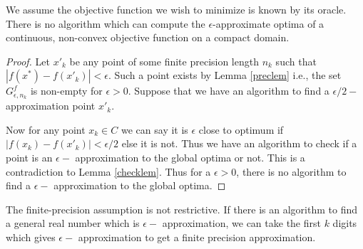 		\begin{theorem}\label{mainthm}
			We assume the objective function we wish to minimize is known by its oracle. There is no algorithm which can compute the $\epsilon$-approximate optima of a continuous, non-convex objective function on a compact domain.
		\end{theorem}
		
		\begin{proof}
		Let $x'_k$ be any point of some finite precision length $n_k$ such that $|f(x^*)-f(x'_k)| < \epsilon$. Such a point exists by Lemma \ref{preclem} i.e., the set $G^f_{\epsilon,n_k}$ is non-empty for $\epsilon > 0$. Suppose that we have an algorithm to find a $\epsilon/2-$ approximation point $x'_k$.%

		Now for any point $x_k \in C$ we can say it is $\epsilon$ close to optimum if $|f(x_k)-f(x'_k)| < \epsilon/2$ else it is not. Thus we have an algorithm to check if a point is an $\epsilon-$ approximation to the global optima or not. This is a contradiction to Lemma \ref{checklem}. Thus for a $\epsilon > 0$, there is no algorithm to find a $\epsilon-$ approximation to the global optima. 
		
	\end{proof}
	
	\begin{corollary}
		The finite-precision assumption is not restrictive. If there is an algorithm to find a general real number which is $\epsilon-$ approximation, we can take the first $k$ digits which gives $\epsilon-$ approximation to get a finite precision approximation. %
	\end{corollary}
	
